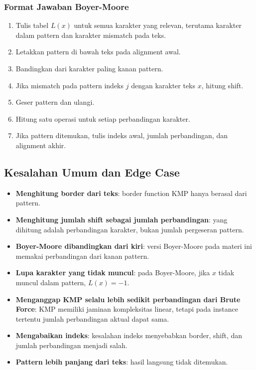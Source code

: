\subsubsection{Format Jawaban Boyer-Moore}

\begin{enumerate}
    \item Tulis tabel $L(x)$ untuk semua karakter yang relevan, terutama karakter dalam pattern dan karakter mismatch pada teks.
    \item Letakkan pattern di bawah teks pada alignment awal.
    \item Bandingkan dari karakter paling kanan pattern.
    \item Jika mismatch pada pattern indeks $j$ dengan karakter teks $x$, hitung shift.
    \item Geser pattern dan ulangi.
    \item Hitung satu operasi untuk setiap perbandingan karakter.
    \item Jika pattern ditemukan, tulis indeks awal, jumlah perbandingan, dan alignment akhir.
\end{enumerate}

\subsection{Kesalahan Umum dan Edge Case}

\begin{itemize}
    \item \textbf{Menghitung border dari teks}: border function KMP hanya berasal dari pattern.
    \item \textbf{Menghitung jumlah shift sebagai jumlah perbandingan}: yang dihitung adalah perbandingan karakter, bukan jumlah pergeseran pattern.
    \item \textbf{Boyer-Moore dibandingkan dari kiri}: versi Boyer-Moore pada materi ini memakai perbandingan dari kanan pattern.
    \item \textbf{Lupa karakter yang tidak muncul}: pada Boyer-Moore, jika $x$ tidak muncul dalam pattern, $L(x)=-1$.
    \item \textbf{Menganggap KMP selalu lebih sedikit perbandingan dari Brute Force}: KMP memiliki jaminan kompleksitas linear, tetapi pada instance tertentu jumlah perbandingan aktual dapat sama.
    \item \textbf{Mengabaikan indeks}: kesalahan indeks menyebabkan border, shift, dan jumlah perbandingan menjadi salah.
    \item \textbf{Pattern lebih panjang dari teks}: hasil langsung tidak ditemukan.
\end{itemize}

